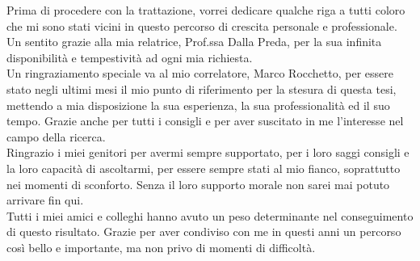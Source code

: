 \clearpage
\thispagestyle{empty}
\vspace*{\fill}
\begin{list}{}{\leftmargin=.2\textwidth \rightmargin=\leftmargin \parsep=0pt }
\item[]
Prima di procedere con la trattazione, vorrei dedicare qualche riga a tutti coloro che mi sono stati vicini in questo percorso di crescita personale e professionale.\\
Un sentito grazie alla mia relatrice, Prof.ssa Dalla Preda, per la sua infinita disponibilità e tempestività ad ogni mia richiesta.\\
Un ringraziamento speciale va al mio correlatore, Marco Rocchetto, per essere stato negli ultimi mesi il mio punto di riferimento per la stesura di questa tesi, mettendo a mia disposizione la sua esperienza, la sua professionalità ed il suo tempo.
Grazie anche per tutti i consigli e per aver suscitato in me l'interesse nel campo della ricerca.\\
Ringrazio i miei genitori per avermi sempre supportato, per i loro saggi consigli e la loro capacità di ascoltarmi, per essere sempre stati al mio fianco, soprattutto nei momenti di sconforto. Senza il loro supporto morale non sarei mai potuto arrivare fin qui.\\
Tutti i miei amici e colleghi hanno avuto un peso determinante nel conseguimento di questo risultato. Grazie per aver condiviso con me in questi anni un percorso così bello e importante, ma non privo di momenti di difficoltà.
\end{list}
\vspace{\fill}
\clearpage
\null
\thispagestyle{empty}
\clearpage